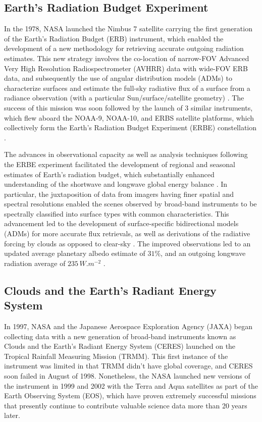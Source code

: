 \documentclass[12pt]{article}
\begin{document}
    \subsection{Earth's Radiation Budget Experiment}

    In the 1978, NASA launched the Nimbus 7 satellite carrying the first generation of the Earth's Radiation Budget (ERB) instrument, which enabled the development of a new methodology for retrieving accurate outgoing radiation estimates. This new strategy involves the co-location of narrow-FOV Advanced Very High Resolution Radiospectrometer (AVHRR) data with wide-FOV ERB data, and subsequently the use of angular distribution models (ADMs) to characterize surfaces and estimate the full-sky radiative flux of a surface from a radiance observation (with a particular Sun/surface/satellite geometry) \cite{taylor_reflectance_1984}\cite{jacobowitz_earth_1983}. The success of this mission was soon followed by the launch of 3 similar instruments, which flew aboard the NOAA-9, NOAA-10, and ERBS satellite platforms, which collectively form the Earth's Radiation Budget Experiment (ERBE) constellation \cite{barkstrom_earth_1984}.

    The advances in observational capacity as well as analysis techniques following the ERBE experiment facilitated the development of regional and seasonal estimates of Earth's radiation budget, which substantially enhanced understanding of the shortwave and longwave global energy balance \cite{breon_global_1994}. In particular, the juxtaposition of data from imagers having finer spatial and spectral resolutions enabled the scenes observed by broad-band instruments to be spectrally classified into surface types with common characteristics. This advancement led to the development of surface-specific bidirectional models (ADMs) for more accurate flux retrievals, as well as derivations of the radiative forcing by clouds as opposed to clear-sky \cite{ramanathan_cloud-radiative_1989}\cite{smith_inversion_1986}. The improved observations led to an updated average planetary albedo estimate of $31\%$, and an outgoing longwave radiation average of $235\,\si{W.m^{-2}}$ \cite{kiehl_earths_1997}.

    \subsection{Clouds and the Earth's Radiant Energy System}

    In 1997, NASA and the Japanese Aerospace Exploration Agency (JAXA) began collecting data with a new generation of broad-band instruments known as Clouds and the Earth's Radiant Energy System (CERES) launched on the Tropical Rainfall Measuring Mission (TRMM). This first instance of the instrument was limited in that TRMM didn't have global coverage, and CERES soon failed in August of 1998. Nonetheless, the NASA launched new versions of the instrument in 1999 and 2002 with the Terra and Aqua satellites as part of the Earth Observing System (EOS), which have proven extremely successful missions that presently continue to contribute valuable science data more than 20 years later.
\end{document}
